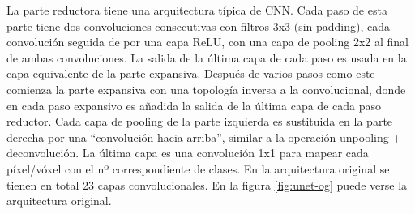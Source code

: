 La parte reductora tiene una arquitectura típica de CNN. Cada paso de esta parte tiene dos convoluciones consecutivas con filtros 3x3 (sin padding), cada convolución seguida de por una capa ReLU, con una capa de pooling 2x2 al final de ambas convoluciones. La salida de la última capa de cada paso es usada en la capa equivalente de la parte expansiva. Después de varios pasos como este comienza la parte expansiva con una topología inversa a la convolucional, donde en cada paso expansivo es añadida la salida de la última capa de cada paso reductor. Cada capa de pooling de la parte izquierda es sustituida en la parte derecha por una ``convolución hacia arriba'', similar a la operación unpooling + deconvolución. La última capa es una convolución 1x1 para mapear cada píxel/vóxel con el nº correspondiente de clases. En la arquitectura original se tienen en total 23 capas convolucionales. En la figura \ref{fig:unet-og} puede verse la arquitectura original.

